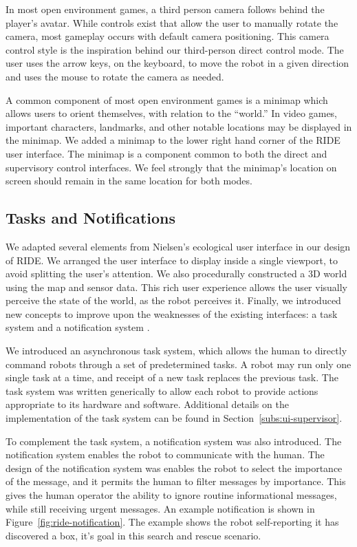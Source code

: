 In most open environment games, a third person camera follows behind the player's avatar. While controls exist that allow the user to manually rotate the camera, most gameplay occurs with default camera positioning. This camera control style is the inspiration behind our third-person direct control mode. The user uses the arrow keys, on the keyboard, to move the robot in a given direction and uses the mouse to rotate the camera as needed.

A common component of most open environment games is a minimap which allows users to orient themselves, with relation to the ``world.'' In video games, important characters, landmarks, and other notable locations may be displayed in the minimap. We added a minimap to the lower right hand corner of the RIDE user interface. The minimap is a component common to both the direct and supervisory control interfaces. We feel strongly that the minimap's location on screen should remain in the same location for both modes.

\subsection{Tasks and Notifications}
We adapted several elements from Nielsen's ecological user interface in our design of RIDE. We arranged the user interface to display inside a single viewport, to avoid splitting the user's attention. We also procedurally constructed a 3D world using the map and sensor data. This rich user experience allows the user visually perceive the state of the world, as the robot perceives it. Finally, we introduced new concepts to improve upon the weaknesses of the existing interfaces: a task system and a notification system \cite{Nielsen_Teleoperation}.

We introduced an asynchronous task system, which allows the human to directly command robots through a set of predetermined tasks. A robot may run only one single task at a time, and receipt of a new task replaces the previous task. The task system was written generically to allow each robot to provide actions appropriate to its hardware and software. Additional details on the implementation of the task system can be found in Section~\ref{subs:ui-supervisor}.

To complement the task system, a notification system was also introduced. The notification system enables the robot to communicate with the human. The design of the notification system was enables the robot to select the importance of the message, and it permits the human to filter messages by importance. This gives the human operator the ability to ignore routine informational messages, while still receiving urgent messages. An example notification is shown in Figure~\ref{fig:ride-notification}. The example shows the robot self-reporting it has discovered a box, it's goal in this search and rescue scenario.

